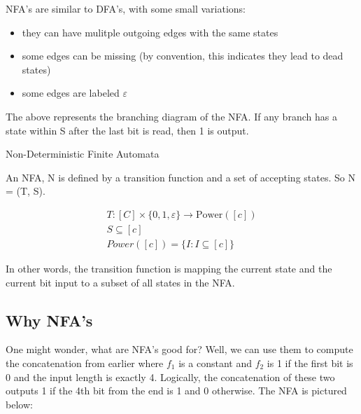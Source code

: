 NFA's are similar to DFA's, with some small variations:
\begin{itemize}
    \item they can have mulitple outgoing edges with the same states
    \item some edges can be missing (by convention, this indicates they lead to dead states)
    \item some edges are labeled $\varepsilon$
\end{itemize}

\begin{example}
    \begin{center}
    \end{center}

    The above represents the branching diagram of the NFA. If any branch has a state within S after the last bit is read, then 1 is output.
\end{example}

\begin{definition}
    Non-Deterministic Finite Automata

    An NFA, N is defined by a transition function and a set of accepting states. So N = (T, S).

    \begin{gather}
        T: [C] \times \{0, 1, \varepsilon\} \rightarrow \text{Power}([c]) \\
        S \subseteq [c] \\
        Power([c]) = \{I: I \subseteq [c] \}
    \end{gather}

    In other words, the transition function is mapping the current state and the current bit input to a subset of all states in the NFA.
\end{definition}

\subsection*{Why NFA's}
One might wonder, what are NFA's good for? Well, we can use them to compute the concatenation from earlier where $f_1$ is a constant and $f_2$ is 1 if the first bit is 0 and the input length is exactly 4. Logically, the concatenation of these two outputs 1 if the 4th bit from the end is 1 and 0 otherwise. The NFA is pictured below:
\begin{center}
\end{center}

